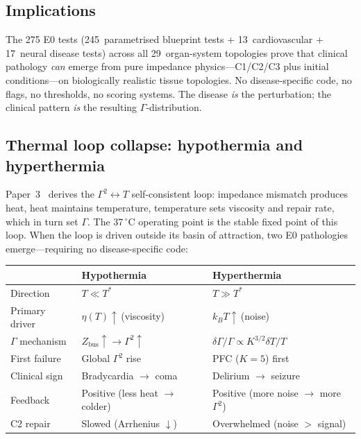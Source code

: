 \documentclass[aps,pre,twocolumn,superscriptaddress,floatfix]{revtex4-2}
\begin{document}
\subsection{Implications}

The 275 E0 tests (245~parametrised blueprint tests +
13~cardiovascular + 17~neural disease tests)
across all 29~organ-system topologies prove
that clinical pathology \emph{can} emerge from pure
impedance physics---C1/C2/C3 plus initial conditions---on
biologically realistic tissue topologies.
No disease-specific code, no flags, no thresholds,
no scoring systems.
The disease \emph{is} the perturbation; the clinical
pattern \emph{is} the resulting $\Gamma$-distribution.

\subsection{Thermal loop collapse: hypothermia and hyperthermia}
\label{sec:thermal-collapse}

Paper~3~\cite{Paper3} derives the $\Gamma^2\!\leftrightarrow\!T$
self-consistent loop: impedance mismatch produces heat,
heat maintains temperature, temperature sets viscosity
and repair rate, which in turn set $\Gamma$.
The 37$\,^\circ$C operating point is the stable fixed
point of this loop.  When the loop is driven outside its
basin of attraction, two E0 pathologies emerge---requiring
no disease-specific code:

\begin{center}
\begin{tabular}{@{}lll@{}}
\toprule
& \textbf{Hypothermia} & \textbf{Hyperthermia} \\
\midrule
Direction & $T \ll T^*$ & $T \gg T^*$ \\
Primary driver & $\eta(T)\!\uparrow$\,(viscosity) & $k_BT\!\uparrow$\,(noise) \\
$\Gamma$ mechanism & $Z_{\mathrm{bus}}\!\uparrow \to \Gamma^2\!\uparrow$ & $\delta\Gamma/\Gamma \propto K^{3/2}\delta T/T$ \\
First failure & Global $\Gamma^2$ rise & PFC ($K{=}5$) first \\
Clinical sign & Bradycardia $\to$ coma & Delirium $\to$ seizure \\
Feedback & Positive (less heat $\to$ colder) & Positive (more noise $\to$ more $\Gamma^2$) \\
C2 repair & Slowed (Arrhenius $\downarrow$) & Overwhelmed (noise $>$ signal) \\
\bottomrule
\end{tabular}
\end{center}
\end{document}
